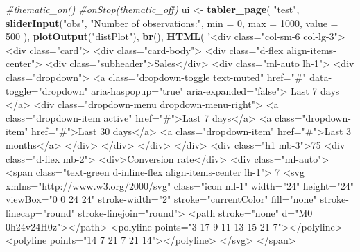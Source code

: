 \documentclass[
]{book}
\newenvironment{Shaded}{\begin{snugshade}}{\end{snugshade}}
\newcommand{\CommentTok}[1]{\textcolor[rgb]{0.56,0.35,0.01}{\textit{#1}}}
\newcommand{\DataTypeTok}[1]{\textcolor[rgb]{0.13,0.29,0.53}{#1}}
\newcommand{\DecValTok}[1]{\textcolor[rgb]{0.00,0.00,0.81}{#1}}
\newcommand{\KeywordTok}[1]{\textcolor[rgb]{0.13,0.29,0.53}{\textbf{#1}}}
\newcommand{\NormalTok}[1]{#1}
\newcommand{\StringTok}[1]{\textcolor[rgb]{0.31,0.60,0.02}{#1}}
\begin{document}
\begin{Shaded}
\begin{Highlighting}[]
\CommentTok{#thematic_on()}
\CommentTok{#onStop(thematic_off)}
\NormalTok{ui <-}\StringTok{ }\KeywordTok{tabler_page}\NormalTok{(}
  \StringTok{"test"}\NormalTok{, }
  \KeywordTok{sliderInput}\NormalTok{(}\StringTok{"obs"}\NormalTok{, }\StringTok{"Number of observations:"}\NormalTok{,}
              \DataTypeTok{min =} \DecValTok{0}\NormalTok{, }\DataTypeTok{max =} \DecValTok{1000}\NormalTok{, }\DataTypeTok{value =} \DecValTok{500}
\NormalTok{  ),}
  \KeywordTok{plotOutput}\NormalTok{(}\StringTok{"distPlot"}\NormalTok{),}
  \KeywordTok{br}\NormalTok{(),}
  \KeywordTok{HTML}\NormalTok{(}
    \StringTok{'<div class="col-sm-6 col-lg-3">}
\StringTok{   <div class="card">}
\StringTok{      <div class="card-body">}
\StringTok{         <div class="d-flex align-items-center">}
\StringTok{            <div class="subheader">Sales</div>}
\StringTok{            <div class="ml-auto lh-1">}
\StringTok{               <div class="dropdown">}
\StringTok{                  <a class="dropdown-toggle text-muted" href="#" data-toggle="dropdown" aria-haspopup="true" aria-expanded="false">}
\StringTok{                  Last 7 days}
\StringTok{                  </a>}
\StringTok{                  <div class="dropdown-menu dropdown-menu-right">}
\StringTok{                     <a class="dropdown-item active" href="#">Last 7 days</a>}
\StringTok{                     <a class="dropdown-item" href="#">Last 30 days</a>}
\StringTok{                     <a class="dropdown-item" href="#">Last 3 months</a>}
\StringTok{                  </div>}
\StringTok{               </div>}
\StringTok{            </div>}
\StringTok{         </div>}
\StringTok{         <div class="h1 mb-3">75%
\StringTok{         <div class="d-flex mb-2">}
\StringTok{            <div>Conversion rate</div>}
\StringTok{            <div class="ml-auto">}
\StringTok{               <span class="text-green d-inline-flex align-items-center lh-1">}
\StringTok{                  7%
\StringTok{                  <svg xmlns="http://www.w3.org/2000/svg" class="icon ml-1" width="24" height="24" viewBox="0 0 24 24" stroke-width="2" stroke="currentColor" fill="none" stroke-linecap="round" stroke-linejoin="round">}
\StringTok{                     <path stroke="none" d="M0 0h24v24H0z"></path>}
\StringTok{                     <polyline points="3 17 9 11 13 15 21 7"></polyline>}
\StringTok{                     <polyline points="14 7 21 7 21 14"></polyline>}
\StringTok{                  </svg>}
\StringTok{               </span>}
}}
\end{Highlighting}
\end{Shaded}
\end{document}
